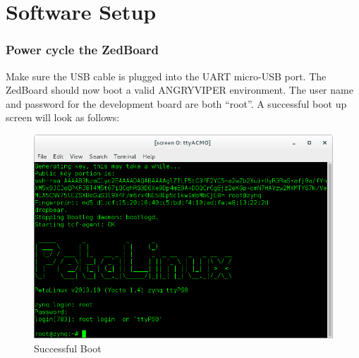 \section{Software Setup}

%

\subsubsection*{Power cycle the ZedBoard}
Make sure the USB cable is plugged into the UART micro-USB port. The ZedBoard should now boot a valid ANGRYVIPER environment.  The user name and password for the development board are both ``root''.  A successful boot up screen will look as follows:

\begin{figure}[H]
	\centerline{\includegraphics[scale=0.5]{zed_boot}}
	\caption{Successful Boot}
	\label{fig:boot1}
\end{figure}
